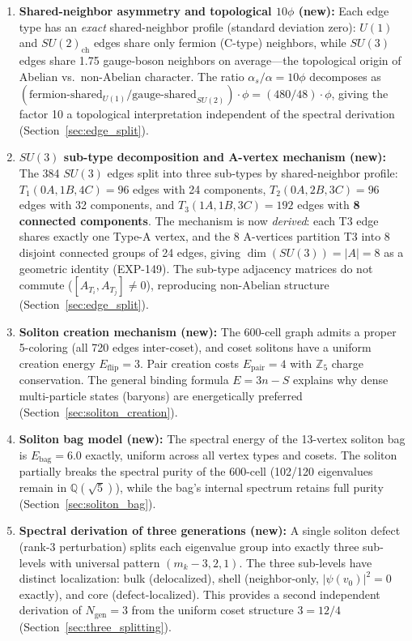 \documentclass[12pt,a4paper]{article}
\begin{document}
\begin{enumerate}
    \item \textbf{Shared-neighbor asymmetry and topological $10\phi$ (new):} Each edge type has an \emph{exact} shared-neighbor profile (standard deviation zero): $U(1)$ and $SU(2)_{\text{ch}}$ edges share only fermion (C-type) neighbors, while $SU(3)$ edges share 1.75 gauge-boson neighbors on average---the topological origin of Abelian vs.\ non-Abelian character. The ratio $\alpha_s/\alpha = 10\phi$ decomposes as $(\text{fermion-shared}_{U(1)} / \text{gauge-shared}_{SU(2)}) \cdot \phi = (480/48) \cdot \phi$, giving the factor 10 a topological interpretation independent of the spectral derivation (Section~\ref{sec:edge_split}).

    \item \textbf{$SU(3)$ sub-type decomposition and A-vertex mechanism (new):} The 384 $SU(3)$ edges split into three sub-types by shared-neighbor profile: $T_1(0A,1B,4C) = 96$ edges with 24 components, $T_2(0A,2B,3C) = 96$ edges with 32 components, and $T_3(1A,1B,3C) = 192$ edges with \textbf{8 connected components}. The mechanism is now \emph{derived}: each T3 edge shares exactly one Type-A vertex, and the 8 A-vertices partition T3 into 8 disjoint connected groups of 24 edges, giving $\dim(SU(3)) = |A| = 8$ as a geometric identity (EXP-149). The sub-type adjacency matrices do not commute ($[A_{T_i}, A_{T_j}] \neq 0$), reproducing non-Abelian structure (Section~\ref{sec:edge_split}).

    \item \textbf{Soliton creation mechanism (new):} The 600-cell graph admits a proper 5-coloring (all 720 edges inter-coset), and coset solitons have a uniform creation energy $E_{\text{flip}} = 3$. Pair creation costs $E_{\text{pair}} = 4$ with $\mathbb{Z}_5$ charge conservation. The general binding formula $E = 3n - S$ explains why dense multi-particle states (baryons) are energetically preferred (Section~\ref{sec:soliton_creation}).

    \item \textbf{Soliton bag model (new):} The spectral energy of the 13-vertex soliton bag is $E_{\text{bag}} = 6.0$ exactly, uniform across all vertex types and cosets. The soliton partially breaks the spectral purity of the 600-cell (102/120 eigenvalues remain in $\mathbb{Q}(\sqrt{5})$), while the bag's internal spectrum retains full purity (Section~\ref{sec:soliton_bag}).

    \item \textbf{Spectral derivation of three generations (new):} A single soliton defect (rank-3 perturbation) splits each eigenvalue group into exactly three sub-levels with universal pattern $(m_k - 3, 2, 1)$. The three sub-levels have distinct localization: bulk (delocalized), shell (neighbor-only, $|\psi(v_0)|^2 = 0$ exactly), and core (defect-localized). This provides a second independent derivation of $N_{\text{gen}} = 3$ from the uniform coset structure $3 = 12/4$ (Section~\ref{sec:three_splitting}).


\end{enumerate}
\end{document}
